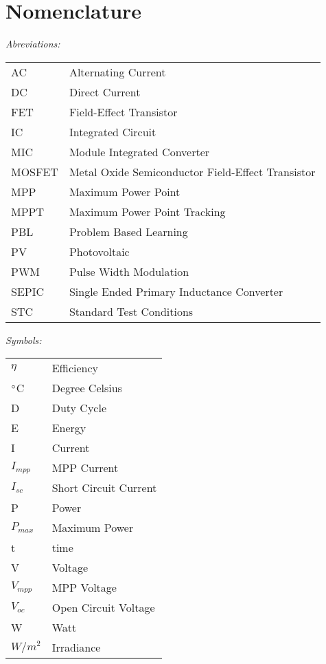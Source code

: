 \chapter*{Nomenclature}

\textit{Abreviations:}\newline
\begin{tabular}{ll} %
AC & Alternating Current\\
DC & Direct Current\\
FET & Field-Effect Transistor\\
IC & Integrated Circuit\\
MIC & Module Integrated Converter\\
MOSFET & Metal Oxide Semiconductor Field-Effect Transistor\\
MPP & Maximum Power Point\\
MPPT & Maximum Power Point Tracking\\
PBL & Problem Based Learning\\
PV & Photovoltaic\\
PWM & Pulse Width Modulation\\
SEPIC & Single Ended Primary Inductance Converter\\
STC & Standard Test Conditions\\
\end{tabular}

\vspace{10mm} %

\textit{Symbols:}\newline
\begin{tabular}{ll}
$\eta$ & Efficiency\\
$\dec$C & Degree Celsius\\
D & Duty Cycle\\
E & Energy\\
I & Current\\
$I_{mpp}$ & MPP Current\\
$I_{sc}$ & Short Circuit Current\\
P & Power\\
$P_{max}$ & Maximum Power\\
t & time\\
V & Voltage\\
$V_{mpp}$ & MPP Voltage\\
$V_{oc}$ & Open Circuit Voltage\\
W & Watt\\
$W/m^2$ & Irradiance\\
\end{tabular}